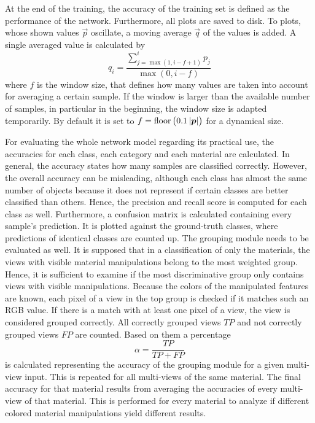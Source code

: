 At the end of the training, the accuracy of the training set is defined as the performance of the network.
Furthermore, all plots are saved to disk.
To plots, whose shown values $\vec{p}$ oscillate, a moving average $\vec{q}$ of the values is added.
A single averaged value is calculated by
\begin{equation}
	q_i = \frac{\sum_{j = \max(1,i-f+1)}^{i} p_j}{\max(0,i-f)}
\end{equation}
where $f$ is the window size, that defines how many values are taken into account for averaging a certain sample.
If the window is larger than the available number of samples, in particular in the beginning, the window size is adapted temporarily.
By default it is set to $f=\operatorname{floor}\left( 0.1 \left| \bm{p} \right| \right)$ for a dynamical size.

For evaluating the whole network model regarding its practical use, the accuracies for each class, each category and each material are calculated.
In general, the accuracy states how many samples are classified correctly.
However, the overall accuracy can be misleading, although each class has almost the same number of objects because it does not represent if certain classes are better classified than others.
Hence, the precision and recall score is computed for each class as well.
Furthermore, a confusion matrix is calculated containing every sample's prediction.
It is plotted against the ground-truth classes, where predictions of identical classes are counted up.
The grouping module needs to be evaluated as well.
It is supposed that in a classification of only the materials, the views with visible material manipulations belong to the most weighted group.
Hence, it is sufficient to examine if the most discriminative group only contains views with visible manipulations.
Because the colors of the manipulated features are known, each pixel of a view in the top group is checked if it matches such an RGB value.
If there is a match with at least one pixel of a view, the view is considered grouped correctly.
All correctly grouped views $TP$ and not correctly grouped views $FP$ are counted.
Based on them a percentage
\begin{equation}
	\label{eq:metric-group}
	\alpha = \frac{TP}{TP + FP}
\end{equation}
is calculated representing the accuracy of the grouping module for a given multi-view input.
This is repeated for all multi-views of the same material.
The final accuracy for that material results from averaging the accuracies of every multi-view of that material.
This is performed for every material to analyze if different colored material manipulations yield different results. 

